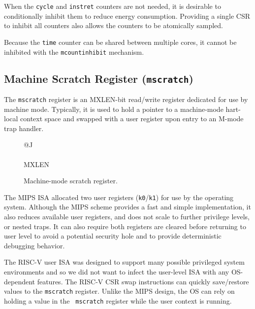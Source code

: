 \begin{commentary}
When the {\tt cycle} and {\tt instret} counters are not needed, it is
desirable to conditionally inhibit them to reduce energy consumption.
Providing a single CSR to inhibit all counters also allows the counters to be
atomically sampled.

Because the {\tt time} counter can be shared between multiple cores, it
cannot be inhibited with the {\tt mcountinhibit} mechanism.
\end{commentary}

\subsection{Machine Scratch Register ({\tt mscratch})}

The {\tt mscratch} register is an MXLEN-bit read/write register
dedicated for use by machine mode.  Typically, it is used to hold a
pointer to a machine-mode hart-local context space and swapped with a
user register upon entry to an M-mode trap handler.

\begin{figure}[h!]
{\footnotesize
\begin{center}
\begin{tabular}{@{}J}
 \\
\hline
{} \\
\hline
MXLEN \\
\end{tabular}
\end{center}
}
\vspace{-0.1in}
\caption{Machine-mode scratch register.}
\label{mscratchreg}
\end{figure}

\begin{commentary}
The MIPS ISA allocated two user registers ({\tt k0}/{\tt k1}) for use
by the operating system.  Although the MIPS scheme provides a fast and
simple implementation, it also reduces available user registers,  and
does not scale to further privilege levels, or nested traps.  It can
also require both registers are cleared before returning to user level
to avoid a potential security hole and to provide deterministic
debugging behavior.

The RISC-V user ISA was designed to support many possible privileged
system environments and so we did not want to infect the user-level
ISA with any OS-dependent features.  The RISC-V CSR swap instructions
can quickly save/restore values to the {\tt mscratch} register.
Unlike the MIPS design, the OS can rely on holding a value in the {\tt
  mscratch} register while the user context is running.
\end{commentary}

